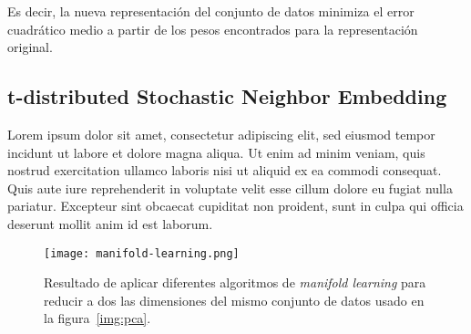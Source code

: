 Es decir, la nueva representación del conjunto de datos minimiza el error cuadrático medio a partir de los pesos encontrados para la representación original.

\subsection{t-distributed Stochastic Neighbor Embedding}\label{subsec:TSNE}

Lorem ipsum dolor sit amet, consectetur adipiscing elit, sed eiusmod tempor incidunt ut labore et dolore magna aliqua.
Ut enim ad minim veniam, quis nostrud exercitation ullamco laboris nisi ut aliquid ex ea commodi consequat.
Quis aute iure reprehenderit in voluptate velit esse cillum dolore eu fugiat nulla pariatur.
Excepteur sint obcaecat cupiditat non proident, sunt in culpa qui officia deserunt mollit anim id est laborum.

\begin{figure}[!h]
    \centering
    \texttt{[image: manifold-learning.png]}
    \caption{Resultado de aplicar diferentes algoritmos de \textit{manifold learning} para reducir a dos las dimensiones del mismo conjunto de datos usado en la figura~\ref{img:pca}.}
    \label{img:manifold-learning}
\end{figure}
